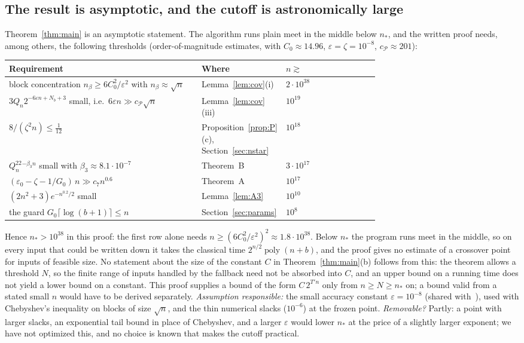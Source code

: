 \documentclass[11pt]{article}
\theoremstyle{definition}
\newcommand{\eps}{\varepsilon}
\newcommand{\ceil}[1]{\lceil #1\rceil}
\newcommand{\poly}{\operatorname{poly}}
\newcommand{\cP}{\mathcal P}
\begin{document}
\subsection{The result is asymptotic, and the cutoff is astronomically large}
Theorem~\ref{thm:main} is an asymptotic statement. The algorithm runs plain meet in the middle below $n_\ast$, and the
written proof needs, among others, the following thresholds (order-of-magnitude estimates, with
$C_0\approx14.96$, $\eps=\zeta=10^{-8}$, $c_{\cP}\approx201$):
\begin{center}
\begin{tabular}{p{0.52\linewidth}p{0.2\linewidth}l}
\toprule
Requirement & Where & $n\gtrsim$\\
\midrule
block concentration $n_\beta\ge6C_0^2/\eps^2$ with $n_\beta\approx\sqrt n$ & Lemma~\ref{lem:cov}(i) & $2\cdot10^{38}$\\
$3Q_n2^{-6\eps n+N_b+3}$ small, i.e.\ $6\eps n\gg c_{\cP}\sqrt n$ & Lemma~\ref{lem:cov}(iii) & $10^{19}$\\
$8/(\zeta^2n)\le\tfrac1{12}$ & Proposition~\ref{prop:P}(c), Section~\ref{sec:nstar} & $10^{18}$\\
$Q_n^22^{-\beta_3n}$ small with $\beta_3\approx8.1\cdot10^{-7}$ & Theorem~B & $3\cdot10^{17}$\\
$(\eps_0-\zeta-1/G_0)\,n\gg c_7n^{0.6}$ & Theorem~A & $10^{17}$\\
$(2n^2+3)e^{-n^{0.2}/2}$ small & Lemma~\ref{lem:A3} & $10^{10}$\\
the guard $G_0\ceil{\log(b+1)}\le n$ & Section~\ref{sec:params} & $10^{8}$\\
\bottomrule
\end{tabular}
\end{center}
Hence $n_\ast>10^{38}$ in this proof: the first row alone needs
$n\ge(6C_0^2/\eps^2)^2\approx1.8\cdot10^{38}$. Below $n_\ast$ the program runs meet in the middle, so on every input
that could be written down it takes the classical time $2^{n/2}\poly(n+b)$, and the proof gives no estimate
of a crossover point for inputs of feasible size. No statement about the size of the constant $C$ in
Theorem~\ref{thm:main}(b) follows from this: the theorem allows a threshold $N$, so the finite range of inputs
handled by the fallback need not be absorbed into $C$, and an upper bound on a running time does not yield a lower
bound on a constant. This proof supplies a bound of the form $C\,2^{T'n}$ only from $n\ge N\ge n_\ast$ on; a bound
valid from a stated small $n$ would have to be derived separately. \emph{Assumption responsible:} the small accuracy constant $\eps=10^{-8}$ (shared with~\cite{OAI}), used with
Chebyshev's inequality on blocks of size $\sqrt n$, and the thin numerical slacks ($10^{-6}$) at the frozen point.
\emph{Removable?} Partly: a point with larger slacks, an exponential tail bound in place of Chebyshev, and a larger
$\eps$ would lower $n_\ast$ at the price of a slightly larger exponent; we have not optimized this, and no choice
is known that makes the cutoff practical.
\end{document}
